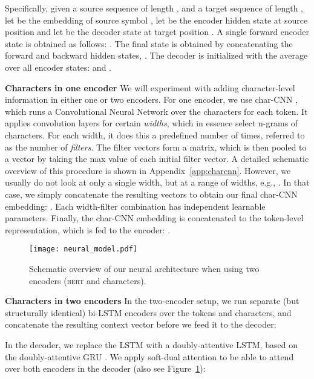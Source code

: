 \documentclass[11pt,a4paper]{article}
\newcommand{\bert}{\textsc{bert}}
\newcommand{\inlineheader}[1]{\vspace{0.06cm}
\noindent\textbf{#1}\quad
}
\begin{document}
Specifically, given a source sequence  of length , and a target sequence  of length , let  be the embedding of source symbol , let  be the encoder hidden state at source position  and let  be the decoder state at target position . A single forward encoder state is obtained as follows:  . The final state is obtained by concatenating the forward and backward hidden states,  . The decoder is initialized with the average over all encoder states:   and .


\inlineheader{Characters in one encoder} We will experiment with adding character-level information in either one or two encoders. For one encoder, we use char-CNN \citep{kim2016character}, which runs a Convolutional Neural Network \citep{lecuncnn:90} over the characters for each token. It applies convolution layers for certain \emph{widths}, which in essence select n-grams of characters. For each width, it does this a predefined number of times, referred to as the number of \emph{filters}. The filter vectors form a matrix, which is then pooled to a vector by taking the max value of each initial filter vector. A detailed schematic overview of this procedure is shown in Appendix~\ref{app:charcnn}. However, we usually do not look at only a single width, but at a range of widths, e.g., . In that case, we simply concatenate the resulting vectors to obtain our final char-CNN embedding: . Each width-filter combination has independent learnable parameters. Finally, the char-CNN embedding is concatenated to the token-level representation, which is fed to the encoder: . 


\begin{figure}[!htb]
  \texttt{[image: neural\_model.pdf]}
  \caption{Schematic overview of our neural architecture when using two encoders (\bert{} and characters).\label{fig:model}}
\end{figure}

\inlineheader{Characters in two encoders} In the two-encoder setup, we run separate (but structurally identical) bi-LSTM encoders over the tokens and characters, and concatenate the resulting context vector before we feed it to the decoder: 




In the decoder, we replace the LSTM with a doubly-attentive LSTM, based on the doubly-attentive GRU \citep{calixto-etal-2017-doubly}. We apply soft-dual attention \citep{junczys-dowmunt-grundkiewicz-2017-exploration} to be able to attend over both encoders in the decoder (also see Figure~\ref{fig:model}):
\end{document}
